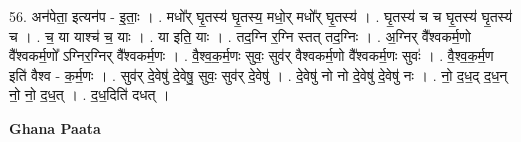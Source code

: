 \documentclass[17pt]{extarticle}
\begin{document}
56. अन॑पेता॒ इत्यन॑प - इ॒ताः॒ । . मधो᳚र् घृ॒तस्य॑ घृ॒तस्य॒ मधो॒र् मधो᳚र् घृ॒तस्य॑ । . घृ॒तस्य॑ च च घृ॒तस्य॑ घृ॒तस्य॑ च । . च॒ या याश्च॑ च॒ याः । . या इति॒ याः । . तद॒ग्नि र॒ग्नि स्तत् तद॒ग्निः । . अ॒ग्निर् वै᳚श्वकर्म॒णो वै᳚श्वकर्म॒णो᳚ ऽग्निर॒ग्निर् वै᳚श्वकर्म॒णः । . वै॒श्व॒क॒र्म॒णः सुवः॒ सुव॑र् वैश्वकर्म॒णो वै᳚श्वकर्म॒णः सुवः॑ । . वै॒श्व॒क॒र्म॒ण इति॑ वैश्व - क॒र्म॒णः । . सुव॑र् दे॒वेषु॑ दे॒वेषु॒ सुवः॒ सुव॑र् दे॒वेषु॑ । . दे॒वेषु॑ नो नो दे॒वेषु॑ दे॒वेषु॑ नः । . नो॒ द॒ध॒द् द॒ध॒न् नो॒ नो॒ द॒ध॒त् । . द॒ध॒दिति॑ दधत् । \newline

\textbf{Ghana Paata } \newline
\end{document}
